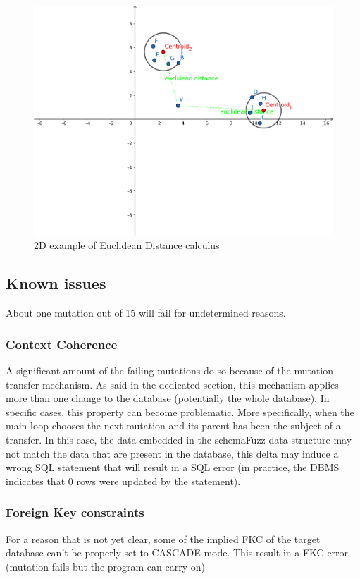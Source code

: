 \documentclass{article}
\begin{document}
\begin{empfile}
\clearpage

\begin{figure}
\centering
  \includegraphics[scale=0.13]{Scoring.png}
  \caption{2D example of Euclidean Distance calculus }
\end{figure}	
		\subsection{Known issues}		
About one mutation out of 15 will fail for undetermined reasons.
			\subsubsection{Context Coherence}
A significant amount of the failing mutations do so because of the mutation transfer mechanism. As said in the dedicated section, this mechanism applies more than one change to the database (potentially the whole database). In specific cases, this property can become problematic. 
More specifically, when the main loop chooses the next mutation and its parent has been the subject of a transfer. In this case, the data embedded in the schemaFuzz data structure may not match the data that are present in the database, this delta may induce a wrong SQL statement that will result in a SQL error (in practice, the DBMS indicates that 0 rows were updated by the statement).
			\subsubsection{Foreign Key constraints}			
For a reason that is not yet clear, some of the implied FKC of the target database can't be properly set to CASCADE mode. This result in a FKC error (mutation fails but the program can carry on)			

\end{empfile}
\end{document}
